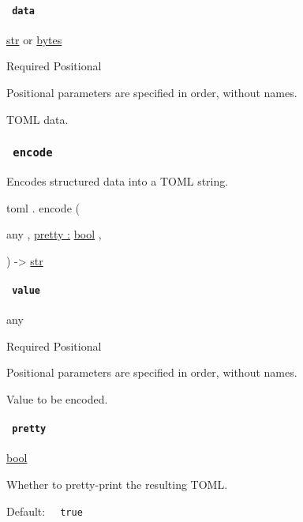 \paragraph{\texorpdfstring{\texttt{\ data\ }}{ data }}\label{definitions-decode-data}

\href{/docs/reference/foundations/str/}{str} {or}
\href{/docs/reference/foundations/bytes/}{bytes}

{Required} {{ Positional }}

\label{definitions-decode-data-positional-tooltip}
Positional parameters are specified in order, without names.

TOML data.

\subsubsection{\texorpdfstring{\texttt{\ encode\ }}{ encode }}\label{definitions-encode}

Encodes structured data into a TOML string.

toml { . } { encode } (

{ { any } , } { \hyperref[definitions-encode-parameters-pretty]{pretty
:} \href{/docs/reference/foundations/bool/}{bool} , }

) -\textgreater{} \href{/docs/reference/foundations/str/}{str}

\paragraph{\texorpdfstring{\texttt{\ value\ }}{ value }}\label{definitions-encode-value}

{ any }

{Required} {{ Positional }}

\label{definitions-encode-value-positional-tooltip}
Positional parameters are specified in order, without names.

Value to be encoded.

\paragraph{\texorpdfstring{\texttt{\ pretty\ }}{ pretty }}\label{definitions-encode-pretty}

\href{/docs/reference/foundations/bool/}{bool}

Whether to pretty-print the resulting TOML.

Default: \texttt{\ }{\texttt{\ true\ }}\texttt{\ }


